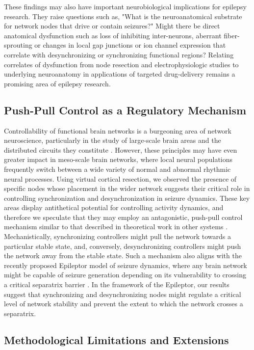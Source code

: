 These findings may also have important neurobiological implications for epilepsy research. They raise questions such as, "What is the neuroanatomical substrate for network nodes that drive or contain seizures?" Might there be direct anatomical dysfunction such as loss of inhibiting inter-neurons, aberrant fiber-sprouting or changes in local gap junctions or ion channel expression that correlate with desynchronizing or synchronizing functional regions? Relating correlates of dysfunction from node resection and electrophysiologic studies to underlying neuroanatomy in applications of targeted drug-delivery remains a promising area of epilepsy research. 


\subsection{Push-Pull Control as a Regulatory Mechanism}
Controllability of functional brain networks is a burgeoning area of network neuroscience, particularly in the study of large-scale brain areas and the distributed circuits they constitute \cite{bassett2006adaptive, gu2014controllability}. However, these principles may have even greater impact in meso-scale brain networks, where local neural populations frequently switch between a wide variety of normal and abnormal rhythmic neural processes. Using virtual cortical resection, we observed the presence of specific nodes whose placement in the wider network suggests their critical role in controlling synchronization and desynchronization in seizure dynamics. These key areas display antithetical potential for controlling activity dynamics, and therefore we speculate that they may employ an antagonistic, push-pull control mechanism similar to that described in theoretical work in other systems \cite{he2014control}. Mechanistically, synchronizing controllers might pull the network towards a particular stable state, and, conversely, desynchronizing controllers might push the network away from the stable state. Such a mechanism also aligns with the recently proposed Epileptor model of seizure dynamics, where any brain network might be capable of seizure generation depending on its vulnerability to crossing a critical separatrix barrier \cite{jirsa2014nature, naze2015computational}. In the framework of the Epileptor, our results suggest that synchronizing and desynchronizing nodes might regulate a critical level of network stability and prevent the extent to which the network crosses a separatrix. 


\subsection{Methodological Limitations and Extensions}

